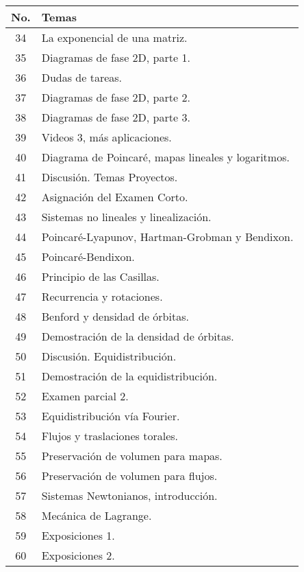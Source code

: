 \begin{table}[H]
	\centering
	\begin{tabular}{||c|p{13cm}||}
		\hline
		\hline
			No. & Temas \\
		\hline
		\hline
			34 & La exponencial de una matriz. \\
			35 & Diagramas de fase 2D, parte 1. \\
			36 & Dudas de tareas. \\
			37 & Diagramas de fase 2D, parte 2. \\
			38 & Diagramas de fase 2D, parte 3. \\
			39 & Videos 3, más aplicaciones. \\
			40 & Diagrama de Poincaré, mapas lineales y logaritmos. \\
			41 & Discusión. Temas Proyectos. \\
			42 & Asignación del Examen Corto. \\
			43 & Sistemas no lineales y linealización. \\
			44 & Poincaré-Lyapunov, Hartman-Grobman y Bendixon. \\
			45 & Poincaré-Bendixon. \\
			46 & Principio de las Casillas. \\
			47 & Recurrencia y rotaciones. \\
			48 & Benford y densidad de órbitas. \\
			49 & Demostración de la densidad de órbitas. \\
			50 & Discusión. Equidistribución. \\
			51 & Demostración de la equidistribución. \\
			52 & Examen parcial 2. \\
			53 & Equidistribución vía Fourier. \\ 
			54 & Flujos y traslaciones torales. \\
			55 & Preservación de volumen para mapas. \\
			56 & Preservación de volumen para flujos. \\
			57 & Sistemas Newtonianos, introducción. \\
			58 & Mecánica de Lagrange. \\
			59 & Exposiciones 1. \\
			60 & Exposiciones 2. \\
		\hline
		\hline
	\end{tabular}
\end{table}





